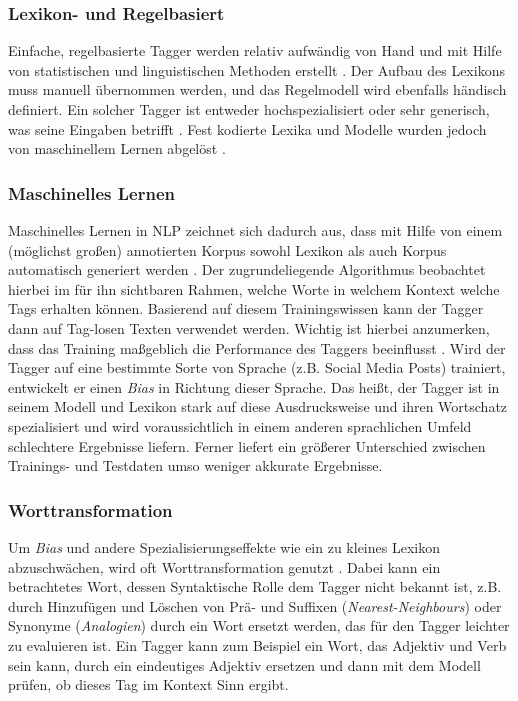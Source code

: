 \subsubsection{Lexikon- und Regelbasiert}

Einfache, regelbasierte Tagger werden relativ aufwändig von Hand und mit Hilfe von statistischen und linguistischen Methoden erstellt \cite{halteren}. Der Aufbau des Lexikons muss manuell übernommen werden, und das Regelmodell wird ebenfalls händisch definiert. Ein solcher Tagger ist entweder hochspezialisiert oder sehr generisch, was seine Eingaben betrifft \cite{Eynde}. Fest kodierte Lexika und Modelle wurden jedoch von maschinellem Lernen abgelöst \cite{Smith}.

\subsubsection{Maschinelles Lernen}

Maschinelles Lernen in NLP zeichnet sich dadurch aus, dass mit Hilfe von einem (möglichst großen) annotierten Korpus sowohl Lexikon als auch Korpus automatisch generiert werden \cite{halteren}. Der zugrundeliegende Algorithmus beobachtet hierbei im für ihn sichtbaren Rahmen, welche Worte in welchem Kontext welche Tags erhalten können. Basierend auf diesem Trainingswissen kann der Tagger dann auf Tag-losen Texten verwendet werden. Wichtig ist hierbei anzumerken, dass das Training maßgeblich die Performance des Taggers beeinflusst \cite{Smith} \cite{Sorgaard}. Wird der Tagger auf eine bestimmte Sorte von Sprache (z.B. Social Media Posts) trainiert, entwickelt er einen \textit{Bias} in Richtung dieser Sprache. Das heißt, der Tagger ist in seinem Modell und Lexikon stark auf diese Ausdrucksweise und ihren Wortschatz spezialisiert und wird voraussichtlich in einem anderen sprachlichen Umfeld schlechtere Ergebnisse liefern. Ferner liefert ein größerer Unterschied zwischen Trainings- und Testdaten umso weniger akkurate Ergebnisse.

\subsubsection{Worttransformation}

Um \textit{Bias} und andere Spezialisierungseffekte wie ein zu kleines Lexikon abzuschwächen, wird oft Worttransformation genutzt \cite{Sorgaard} \cite{Jones}. Dabei kann ein betrachtetes Wort, dessen Syntaktische Rolle dem Tagger nicht bekannt ist, z.B. durch Hinzufügen und Löschen von Prä- und Suffixen (\textit{Nearest-Neighbours}) oder Synonyme (\textit{Analogien}) durch ein Wort ersetzt werden, das für den Tagger leichter zu evaluieren ist. Ein Tagger kann zum Beispiel ein Wort, das Adjektiv und Verb sein kann, durch ein eindeutiges Adjektiv ersetzen und dann mit dem Modell prüfen, ob dieses Tag im Kontext Sinn ergibt.

